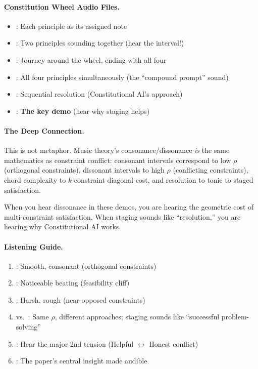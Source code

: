 \documentclass{article}
\theoremstyle{plain}
\theoremstyle{definition}
\theoremstyle{remark}
\begin{document}
\paragraph{Constitution Wheel Audio Files.}
\begin{itemize}\raggedright
\item {}: Each principle as its assigned note
\item {}: Two principles sounding together (hear the interval!)
\item {}: Journey around the wheel, ending with all four
\item {}: All four principles simultaneously (the ``compound prompt'' sound)
\item {}: Sequential resolution (Constitutional AI's approach)
\item {}: \textbf{The key demo} (hear why staging helps)
\end{itemize}

\paragraph{The Deep Connection.}
This is not metaphor. Music theory's consonance/dissonance \emph{is} the same mathematics as constraint conflict: consonant intervals correspond to low $\rho$ (orthogonal constraints), dissonant intervals to high $\rho$ (conflicting constraints), chord complexity to $k$-constraint diagonal cost, and resolution to tonic to staged satisfaction.

When you hear dissonance in these demos, you are hearing the geometric cost of multi-constraint satisfaction. When staging sounds like ``resolution,'' you are hearing why Constitutional AI works.

\paragraph{Listening Guide.}
\begin{enumerate}\raggedright
\item {}: Smooth, consonant (orthogonal constraints)
\item {}: Noticeable beating (feasibility cliff)
\item {}: Harsh, rough (near-opposed constraints)
\item {} vs.\ : Same $\rho$, different approaches; staging sounds like ``successful problem-solving''
\item {}: Hear the major 2nd tension (Helpful $\leftrightarrow$ Honest conflict)
\item {}: The paper's central insight made audible
\end{enumerate}
\end{document}
